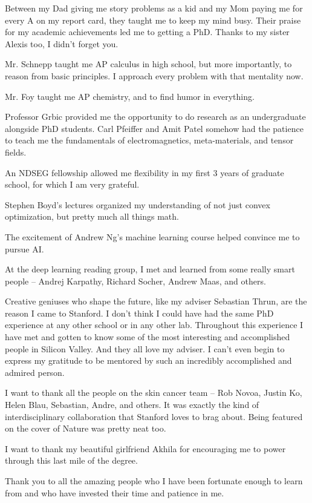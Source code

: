 Between my Dad giving me story problems as a kid and my Mom paying me for every A on my report card, they taught me to keep my mind busy.  Their praise for my academic achievements led me to getting a PhD.  Thanks to my sister Alexis too, I didn't forget you.

Mr. Schnepp taught me AP calculus in high school, but more importantly, to reason from basic principles.  I approach every problem with that mentality now.

Mr. Foy taught me AP chemistry, and to find humor in everything.

Professor Grbic provided me the opportunity to do research as an undergraduate alongside PhD students.  Carl Pfeiffer and Amit Patel somehow had the patience to teach me the fundamentals of electromagnetics, meta-materials, and tensor fields.

An NDSEG fellowship allowed me flexibility in my first 3 years of graduate school, for which I am very grateful.

Stephen Boyd's lectures organized my understanding of not just convex optimization, but pretty much all things math.

The excitement of Andrew Ng's machine learning course helped convince me to pursue AI.

At the deep learning reading group, I met and learned from some really smart people -- Andrej Karpathy, Richard Socher, Andrew Maas, and others.

Creative geniuses who shape the future, like my adviser Sebastian Thrun, are the reason I came to Stanford.  I don't think I could have had the same PhD experience at any other school or in any other lab.  Throughout this experience I have met and gotten to know some of the most interesting and accomplished people in Silicon Valley.  And they all love my adviser.  I can't even begin to express my gratitude to be mentored by such an incredibly accomplished and admired person.

I want to thank all the people on the skin cancer team -- Rob Novoa, Justin Ko, Helen Blau, Sebastian, Andre, and others.  It was exactly the kind of interdisciplinary collaboration that Stanford loves to brag about.  Being featured on the cover of Nature was pretty neat too.

I want to thank my beautiful girlfriend Akhila for encouraging me to power through this last mile of the degree.

Thank you to all the amazing people who I have been fortunate enough to learn from and who have invested their time and patience in me.